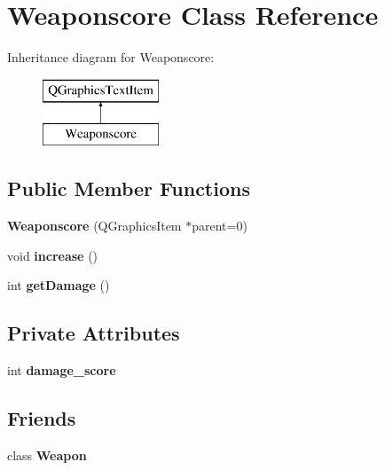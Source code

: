 \hypertarget{class_weaponscore}{}\section{Weaponscore Class Reference}
\label{class_weaponscore}
Inheritance diagram for Weaponscore\+:\begin{figure}[H]
\begin{center}
\leavevmode
\includegraphics[height=2.000000cm]{class_weaponscore}
\end{center}
\end{figure}
\subsection*{Public Member Functions}
\begin{DoxyCompactItemize}
\item 
{\bfseries Weaponscore} (Q\+Graphics\+Item $\ast$parent=0)\hypertarget{class_weaponscore_afac1c5e0243854098e09ffa5139f4e5b}{}\label{class_weaponscore_afac1c5e0243854098e09ffa5139f4e5b}

\item 
void {\bfseries increase} ()\hypertarget{class_weaponscore_a555c98168d06757088feadbb3d978d77}{}\label{class_weaponscore_a555c98168d06757088feadbb3d978d77}

\item 
int {\bfseries get\+Damage} ()\hypertarget{class_weaponscore_a9dc99bef95de474087f9e08eb178a4bd}{}\label{class_weaponscore_a9dc99bef95de474087f9e08eb178a4bd}

\end{DoxyCompactItemize}
\subsection*{Private Attributes}
\begin{DoxyCompactItemize}
\item 
int {\bfseries damage\+\_\+score}\hypertarget{class_weaponscore_aaf17b1bc5499cf076e19d70efcd91cd4}{}\label{class_weaponscore_aaf17b1bc5499cf076e19d70efcd91cd4}

\end{DoxyCompactItemize}
\subsection*{Friends}
\begin{DoxyCompactItemize}
\item 
class {\bfseries Weapon}\hypertarget{class_weaponscore_ab356dbee0f1e915287732c65e8ef61e1}{}\label{class_weaponscore_ab356dbee0f1e915287732c65e8ef61e1}

\end{DoxyCompactItemize}


